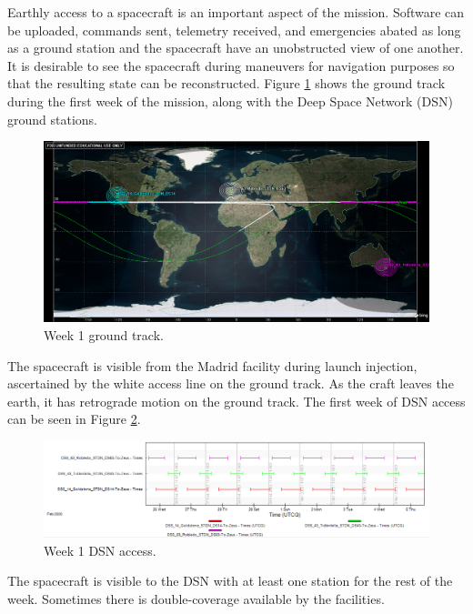 \documentclass[]{aiaa-tc}%
\begin{document}
Earthly access to a spacecraft is an important aspect of the mission. Software can be uploaded, commands sent, telemetry received, and emergencies abated as long as a ground station and the spacecraft have an unobstructed view of one another. It is desirable to see the spacecraft during maneuvers for navigation purposes so that the resulting state can be reconstructed. Figure \ref{fig:week1AccessGT} shows the ground track during the first week of the mission, along with the Deep Space Network (DSN) ground stations.
	\begin{figure}[H]
		\centering
			\includegraphics[width = 12cm]{../Figures/Week1GroundTrack.png}
		\caption{Week 1 ground track. }
		\label{fig:week1AccessGT}
	\end{figure}	

The spacecraft is visible from the Madrid facility during launch injection, ascertained by the white access line on the ground track. As the craft leaves the earth, it has retrograde motion on the ground track. The first week of DSN access can be seen in Figure \ref{fig:week1Access}.
	\begin{figure}[H]
		\centering
			\includegraphics[width = 18cm]{../Figures/Week1Access.png}
		\caption{Week 1 DSN access. }
		\label{fig:week1Access}
	\end{figure}	

 The spacecraft is visible to the DSN with at least one station for the rest of the week. Sometimes there is double-coverage available by the facilities.

	\vspace{5 mm}
\end{document}

